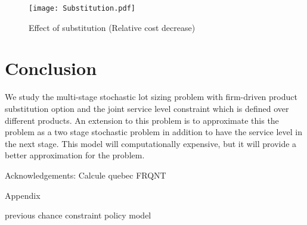 \documentclass[10pt]{article}
\begin{document}


\begin{figure}[!h]
\begin{center}
\texttt{[image: Substitution.pdf]}
\caption{Effect of substitution (Relative cost decrease)} 
\label{fig:sustitution}
\end{center}
\end{figure}




\section{Conclusion}

We study the multi-stage stochastic lot sizing problem with firm-driven product substitution option and the joint service level constraint which is defined over different products. 
An extension to this problem is to approximate this the problem as a two stage stochastic problem in addition to have the service level in the next stage. This model will computationally expensive, but it will provide a better approximation for the problem.

Acknowledgements:
Calcule quebec
FRQNT


Appendix 

previous chance constraint policy model
\end{document}
